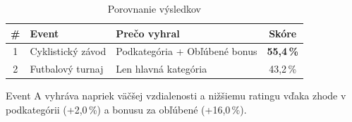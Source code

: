   \begin{table}[H]
  \centering                                                                                                                                                                                                                        
  \begin{tabular}{|c|l|l|c|}
  \hline                                                                                                                                                                                                                            
  \textbf{\#} & \textbf{Event} & \textbf{Prečo vyhral} & \textbf{Skóre} \\                                                                                                                                                          
  \hline                                                                                                                                                                                                                            
  1 & Cyklistický závod & Podkategória + Obľúbené bonus & \textbf{55,4\,\%} \\                                                                                                                                                      
  \hline                                                                                                                                                                                                                            
  2 & Futbalový turnaj & Len hlavná kategória & 43,2\,\% \\                                                                                                                                                                         
  \hline                                                                                                                                                                                                                            
  \end{tabular}
  \caption{Porovnanie výsledkov}
  \end{table}

  Event A vyhráva napriek väčšej vzdialenosti a nižšiemu ratingu vďaka
  zhode v podkategórii (+2,0\,\%) a bonusu za obľúbené (+16,0\,\%).

